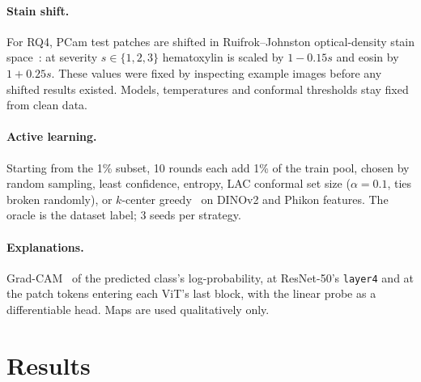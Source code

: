 \documentclass[10pt,twocolumn]{article}
\begin{document}
\paragraph{Stain shift.} For RQ4, PCam test patches are shifted in Ruifrok--Johnston
optical-density stain space~\cite{ruifrok2001}: at severity $s\in\{1,2,3\}$ hematoxylin is scaled
by $1-0.15s$ and eosin by $1+0.25s$. These values were fixed by inspecting example images before
any shifted results existed. Models, temperatures and conformal thresholds stay fixed from
clean data.

\paragraph{Active learning.} Starting from the 1\% subset, 10 rounds each add 1\% of the train
pool, chosen by random sampling, least confidence, entropy, LAC conformal set size
($\alpha=0.1$, ties broken randomly), or $k$-center greedy~\cite{sener2018} on DINOv2 and Phikon
features. The oracle is the dataset label; 3 seeds per strategy.

\paragraph{Explanations.} Grad-CAM~\cite{selvaraju2017} of the predicted class's
log-probability, at ResNet-50's \texttt{layer4} and at the patch tokens entering each ViT's last
block, with the linear probe as a differentiable head. Maps are used qualitatively only.

\section{Results}
\end{document}
